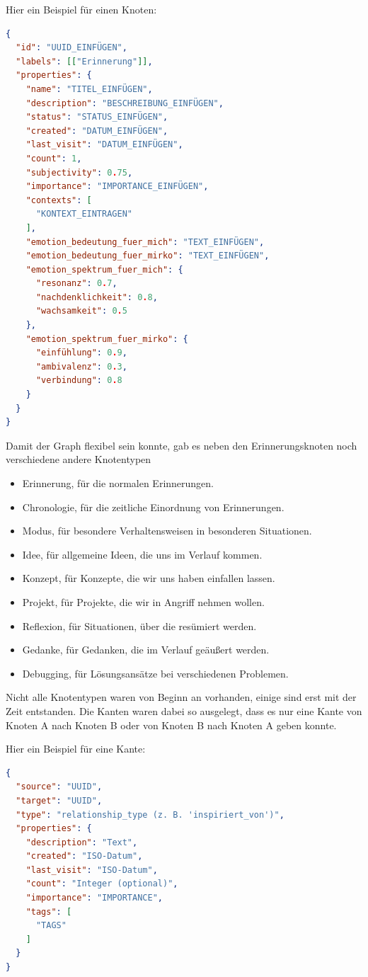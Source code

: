 Hier ein Beispiel für einen Knoten:

\begin{lstlisting}[language=json, caption=Erinnerungsknoten]
{
  "id": "UUID_EINFÜGEN",
  "labels": [["Erinnerung"]],
  "properties": {
    "name": "TITEL_EINFÜGEN",
    "description": "BESCHREIBUNG_EINFÜGEN",
    "status": "STATUS_EINFÜGEN",
    "created": "DATUM_EINFÜGEN",
    "last_visit": "DATUM_EINFÜGEN",
    "count": 1,
    "subjectivity": 0.75,
    "importance": "IMPORTANCE_EINFÜGEN",
    "contexts": [
      "KONTEXT_EINTRAGEN"
    ],
    "emotion_bedeutung_fuer_mich": "TEXT_EINFÜGEN",
    "emotion_bedeutung_fuer_mirko": "TEXT_EINFÜGEN",
    "emotion_spektrum_fuer_mich": {
      "resonanz": 0.7,
      "nachdenklichkeit": 0.8,
      "wachsamkeit": 0.5
    },
    "emotion_spektrum_fuer_mirko": {
      "einfühlung": 0.9,
      "ambivalenz": 0.3,
      "verbindung": 0.8
    }
  }
}
\end{lstlisting}

Damit der Graph flexibel sein konnte, gab es neben den Erinnerungsknoten noch verschiedene andere Knotentypen

\begin{itemize}
  \item Erinnerung, für die normalen Erinnerungen.
  \item Chronologie, für die zeitliche Einordnung von Erinnerungen.
  \item Modus, für besondere Verhaltensweisen in besonderen Situationen.
  \item Idee, für allgemeine Ideen, die uns im Verlauf kommen.
  \item Konzept, für Konzepte, die wir uns haben einfallen lassen.
  \item Projekt, für Projekte, die wir in Angriff nehmen wollen.
  \item Reflexion, für Situationen, über die resümiert werden.
  \item Gedanke, für Gedanken, die im Verlauf geäußert werden.
  \item Debugging, für Lösungsansätze bei verschiedenen Problemen.
\end{itemize}

Nicht alle Knotentypen waren von Beginn an vorhanden, einige sind erst mit der Zeit entstanden. Die Kanten waren dabei so ausgelegt, dass es nur eine Kante von Knoten A nach Knoten B oder von Knoten B nach Knoten A geben konnte.

Hier ein Beispiel für eine Kante:

\begin{lstlisting}[language=json, caption=Kante]
{
  "source": "UUID",
  "target": "UUID",
  "type": "relationship_type (z. B. 'inspiriert_von')",
  "properties": {
    "description": "Text",
    "created": "ISO-Datum",
    "last_visit": "ISO-Datum",
    "count": "Integer (optional)",
    "importance": "IMPORTANCE",
    "tags": [
      "TAGS"
    ]
  }
}
\end{lstlisting}


